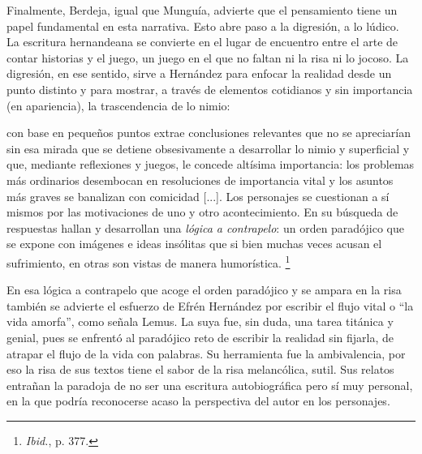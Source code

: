 \documentclass[14pt,twoside,final]{extbook} %
\let\oldfootnote\footnote
\renewcommand\footnote[1]{%
\oldfootnote{\hspace{1mm}#1}}
\begin{document}
Finalmente, Berdeja, igual que Munguía, advierte que el pensamiento tiene un papel fundamental en esta narrativa. Esto abre paso a la digresión, a lo lúdico. La escritura hernandeana se convierte en el lugar de encuentro entre el arte de contar historias y el juego, un juego en el que no faltan ni la risa ni lo jocoso. La digresión, en ese sentido, sirve a Hernández para enfocar la realidad desde un punto distinto y para mostrar, a través de elementos cotidianos y sin importancia (en apariencia), la trascendencia de lo nimio:
\begin{quoting}
con base en pequeños puntos extrae conclusiones relevantes que no se apreciarían sin esa mirada que se detiene obsesivamente a desarrollar lo nimio y superficial y que, mediante reflexiones y juegos, le concede altísima importancia: los problemas más ordinarios desembocan en resoluciones de importancia vital y los asuntos más graves se banalizan con comicidad [...]. Los personajes se cuestionan a sí mismos por las motivaciones de uno y otro acontecimiento. En su búsqueda de respuestas hallan y desarrollan una \emph{lógica a contrapelo}: un orden paradójico que se expone con imágenes e ideas insólitas que si bien muchas veces acusan el sufrimiento, en otras son vistas de manera humorística.\footnote{\emph{Ibid.}, p. 377.}
\end{quoting}
En esa lógica a contrapelo que acoge el orden paradójico y se ampara en la risa también se advierte el esfuerzo de Efrén Hernández por escribir el flujo vital o ``la vida amorfa'', como señala Lemus. La suya fue, sin duda, una tarea titánica y genial, pues se enfrentó al paradójico reto de escribir la realidad sin fijarla, de atrapar el flujo de la vida con palabras. Su herramienta fue la ambivalencia, por eso la risa de sus textos tiene el sabor de la risa melancólica, sutil. Sus relatos entrañan la paradoja de no ser una escritura autobiográfica pero sí muy personal, en la que podría reconocerse acaso la perspectiva del autor en los personajes.
\end{document}
